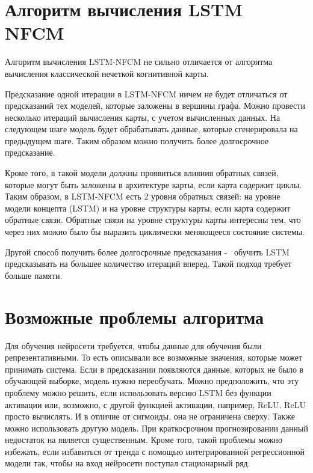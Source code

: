 

\section{Алгоритм вычисления LSTM NFCM}


Алгоритм вычисления LSTM-NFCM не сильно отличается от
алгоритма вычисления классической нечеткой когнитивной карты.

Предсказание одной итерации в LSTM-NFCM ничем не будет отличаться
от предсказаний тех моделей, которые заложены в вершины графа.
Можно провести несколько итераций вычисления карты, с учетом вычисленных
данных. На следующем шаге модель будет обрабатывать данные,
которые сгенерировала на предыдущем шаге. Таким образом можно получить
более долгосрочное предсказание.

Кроме того, в такой модели должны проявиться влияния обратных связей, которые могут
быть заложены в архитектуре карты, если карта содержит циклы.
Таким образом, в LSTM-NFCM есть 2 уровня обратных связей:
на уровне модели концепта (LSTM) и на уровне структуры карты,
если карта содержит обратные связи.
Обратные связи на уровне структуры карты интересны тем, что
через них можно было бы выразить циклически меняющееся состояние системы.

Другой способ получить более долгосрочные предсказания -~ обучить LSTM
предсказывать на большее количество итераций вперед. Такой подход
требует больше памяти.



\section{Возможные проблемы алгоритма}

Для обучения  нейросети требуется, чтобы
данные для обучения были репрезентативными. То есть
описывали все возможные значения, которые может принимать система.
Если в предсказании появляются данные, которых не было в обучающей выборке,
модель нужно переобучать. Можно предположить, что эту проблему можно решить,
если использовать версию LSTM без функции активации или, возможно, с другой
функцией активации, например, ReLU. ReLU просто вычислять. И в отличие от
сигмоиды, она не ограничена сверху. Также можно использовать другую модель.
При краткосрочном прогнозировании данный недостаток на является существенным.
Кроме того, такой проблемы можно избежать, если избавиться от тренда с
помощью интегрированной регрессионной модели так, чтобы на вход нейросети
поступал стационарный ряд.

